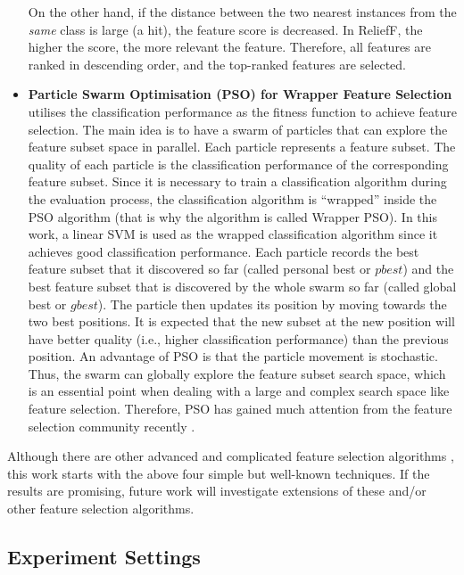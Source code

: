 \documentclass[runningheads]{llncs}
\begin{document}
\begin{itemize}
        On the other hand, if the distance between the two nearest instances from the \textit{same} class is large (a hit), the feature score is decreased. 
        In ReliefF, the higher the score, the more relevant the feature. Therefore, all features are ranked in descending order, and the top-ranked features are selected. 
  \item \textbf{Particle Swarm Optimisation (PSO) \cite{kennedy1995particle,7969325} for Wrapper Feature Selection} utilises the classification performance as the fitness function to achieve feature selection.
        The main idea is to have a swarm of particles that can explore the feature subset space in parallel. 
        Each particle represents a feature subset. 
        The quality of each particle is the classification performance of the corresponding feature subset. 
        Since it is necessary to train a classification algorithm during the evaluation process, the classification algorithm is ``wrapped'' inside the PSO algorithm (that is why the algorithm is called Wrapper PSO). 
        In this work, a linear SVM is used as the wrapped classification algorithm since it achieves good classification performance. 
        Each particle records the best feature subset that it discovered so far (called personal best or $pbest$) and the best feature subset that is discovered by the whole swarm so far (called global best or $gbest$). 
        The particle then updates its position by moving towards the two best positions. 
        It is expected that the new subset at the new position will have better quality (i.e., higher classification performance) than the previous position. 
        An advantage of PSO is that the particle movement is stochastic. 
        Thus, the swarm can globally explore the feature subset search space, which is an essential point when dealing with a large and complex search space like feature selection. 
        Therefore, PSO has gained much attention from the feature selection community recently \cite{nguyen2020survey}.
\end{itemize}

Although there are other advanced and complicated feature selection algorithms \cite{li2017feature,zhang2020binary,alsahaf2022framework,alweshah2022coronavirus}, this work starts with the above four simple but well-known techniques. 
If the results are promising, future work will investigate extensions of these and/or other feature selection algorithms. 

\subsection{Experiment Settings}
\end{document}
